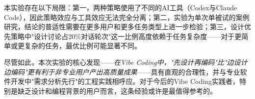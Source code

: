 本实验存在以下局限：第一，两种策略使用了不同的AI工具（Codex与Claude Code），因此策略效应与工具效应无法完全分离；第二，实验为单次单被试的案例研究，结论的普适性需要在更多用户和更多任务类型上进一步检验；第三，设计优先策略中"设计讨论占20\%对话轮次"这一比例高度依赖于任务复杂度——对于更简单或更复杂的任务，最优比例可能显著不同。

尽管如此，本次实验的核心发现——\textit{在Vibe Coding中，"先设计再编码"比"边设计边编码"更有利于非专业用户产出高质量成果}——具有直观的合理性，并与专业软件开发中"需求分析先行"的工程实践相呼应。对于今后的Vibe Coding实践者，特别是缺乏设计和编程背景的用户而言，这条经验或许是最值得参考的。
